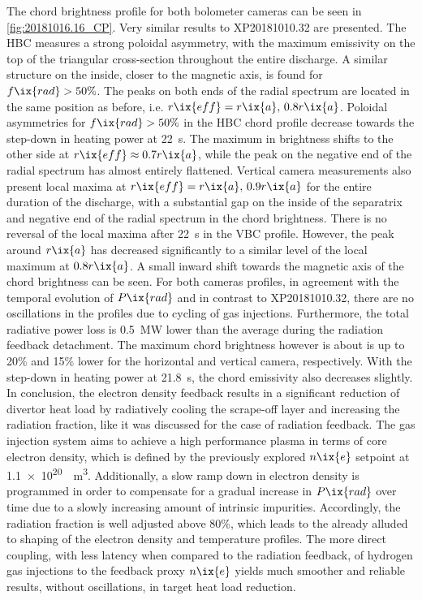 %
                The chord brightness profile for both bolometer cameras can be seen in \cref{fig:20181016.16_CP}. Very similar results to  XP20181010.32 are presented. The HBC measures a strong poloidal asymmetry, with the maximum emissivity on the top of the triangular cross-section throughout the entire discharge. A similar structure on the inside, closer to the magnetic axis, is found for $f\ix{rad}>50\%$. The peaks on both ends of the radial spectrum are located in the same position as before, i.e. $r\ix{eff}=r\ix{a},\,0.8r\ix{a}$. Poloidal asymmetries for $f\ix{rad}>50\%$ in the HBC chord profile decrease towards the step-down in heating power at \SI{22}{\second}. The maximum in brightness shifts to the other side at $r\ix{eff}\approx0.7r\ix{a}$, while the peak on the negative end of the radial spectrum has almost entirely flattened. Vertical camera measurements also present local maxima at $r\ix{eff}=\-r\ix{a},\,0.9r\ix{a}$ for the entire duration of the discharge, with a substantial gap on the inside of the separatrix and negative end of the radial spectrum in the chord brightness. There is no reversal of the local maxima after \SI{22}{\second} in the VBC profile. However, the peak around $\-r\ix{a}$ has decreased significantly to a similar level of the local maximum at $0.8r\ix{a}$. A small inward shift towards the magnetic axis of the chord brightness can be seen. For both cameras profiles, in agreement with the temporal evolution of $P\ix{rad}$ and in contrast to XP20181010.32, there are no oscillations in the profiles due to cycling of gas injections. Furthermore, the total radiative power loss is \SI{0.5}{\mega\watt} lower than the average during the radiation feedback detachment. The maximum chord brightness however is about is up to 20\% and 15\% lower for the horizontal and vertical camera, respectively. With the step-down in heating power at \SI{21.8}{\second}, the chord emissivity also decreases slightly.\\%
                In conclusion, the electron density feedback results in a significant reduction of divertor heat load by radiatively cooling the scrape-off layer and increasing the radiation fraction, like it was discussed for the case of radiation feedback. The gas injection system aims to achieve a high performance plasma in terms of core electron density, which is defined by the previously explored $n\ix{e}$ setpoint at \SI{1.1e20}{\per\cubic\meter}. Additionally, a slow ramp down in electron density is programmed in order to compensate for a gradual increase in $P\ix{rad}$ over time due to a slowly increasing amount of intrinsic impurities. Accordingly, the radiation fraction is well adjusted above 80\%, which leads to the already alluded to shaping of the electron density and temperature profiles. The more direct coupling, with less latency when compared to the radiation feedback, of hydrogen gas injections to the feedback proxy $n\ix{e}$ yields much smoother and reliable results, without oscillations, in target heat load reduction.\\%
